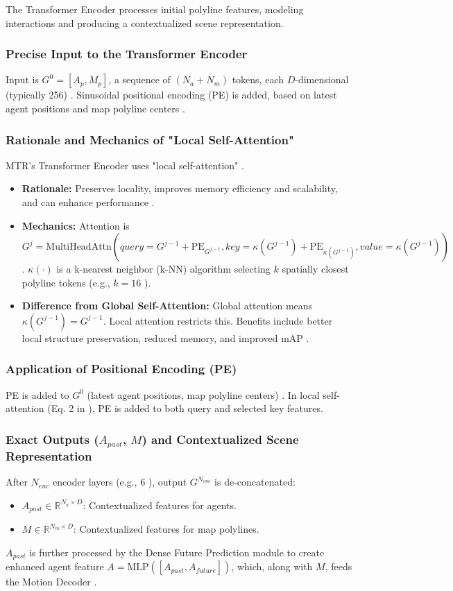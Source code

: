 The Transformer Encoder processes initial polyline features, modeling interactions and producing a contextualized scene representation.

\subsubsection{Precise Input to the Transformer Encoder}
Input is $G^0 = [A_p, M_p]$, a sequence of $(N_a + N_m)$ tokens, each $D$-dimensional (typically 256) \cite{Shi2022MTR}. Sinusoidal positional encoding (PE) is added, based on latest agent positions and map polyline centers \cite{Shi2022MTR}.

\subsubsection{Rationale and Mechanics of "Local Self-Attention"}
MTR's Transformer Encoder uses "local self-attention" \cite{Shi2022MTR}.
\begin{itemize}
    \item \textbf{Rationale:} Preserves locality, improves memory efficiency and scalability, and can enhance performance \cite{Shi2022MTR}.
    \item \textbf{Mechanics:} Attention is $G^{j} = \text{MultiHeadAttn}(query=G^{j-1}+\text{PE}_{G^{j-1}}, key=\kappa(G^{j-1})+\text{PE}_{\kappa(G^{j-1})}, value=\kappa(G^{j-1}))$ \cite{Shi2022MTR}. $\kappa(\cdot)$ is a k-nearest neighbor (k-NN) algorithm selecting $k$ spatially closest polyline tokens (e.g., $k=16$ \cite{Shi2022MTR}).
    \item \textbf{Difference from Global Self-Attention:} Global attention means $\kappa(G^{j-1}) = G^{j-1}$. Local attention restricts this. Benefits include better local structure preservation, reduced memory, and improved mAP \cite{Shi2022MTR}.
\end{itemize}

\subsubsection{Application of Positional Encoding (PE)}
PE is added to $G^0$ (latest agent positions, map polyline centers) \cite{Shi2022MTR}. In local self-attention (Eq. 2 in \cite{Shi2022MTR}), PE is added to both query and selected key features.

\subsubsection{Exact Outputs ($A_{past}$, $M$) and Contextualized Scene Representation}
After $N_{enc}$ encoder layers (e.g., 6 \cite{Shi2022MTR_A}), output $G^{N_{enc}}$ is de-concatenated:
\begin{itemize}
    \item $A_{past} \in \mathbb{R}^{N_a \times D}$: Contextualized features for agents.
    \item $M \in \mathbb{R}^{N_m \times D}$: Contextualized features for map polylines.
\end{itemize}
$A_{past}$ is further processed by the Dense Future Prediction module to create enhanced agent feature $A = \text{MLP}([A_{past}, A_{future}])$, which, along with $M$, feeds the Motion Decoder \cite{Shi2022MTR}.

